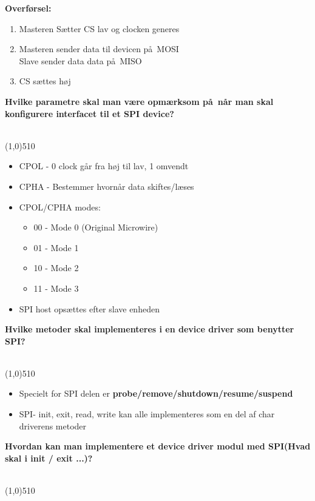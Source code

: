 \documentclass{paper}
\begin{document}
\textbf{Overf\o rsel:}
\begin{enumerate}
	\item Masteren S\ae tter CS lav og clocken generes
	\item Masteren sender data til devicen p\aa\ MOSI\\
		Slave sender data data p\aa\ MISO
	\item CS s\ae ttes h\o j\\
\end{enumerate}
\begin{large}\textbf{Hvilke parametre skal man v\ae re opm\ae rksom p\aa\ n\aa r man skal konfigurere interfacet til et SPI device?}\end{large}\\
\line(1,0){510}
\begin{itemize}
	\item CPOL - 0 clock g\aa r fra h\o j til lav, 1 omvendt
	\item CPHA - Bestemmer hvorn\aa r data skiftes/l\ae ses
	\item CPOL/CPHA modes:
	\begin{itemize}
		\item 00 - Mode 0 (Original Microwire)
		\item 01 - Mode 1
		\item 10 - Mode 2
		\item 11 - Mode 3
	\end{itemize}
	\item SPI host ops\ae ttes efter slave enheden\\	
\end{itemize}
\begin{large}\textbf{Hvilke metoder skal implementeres i en device driver som benytter SPI?}\end{large}\\
\line(1,0){510}
\begin{itemize}
	\item Specielt for SPI delen er \textbf{probe/remove/shutdown/resume/suspend}
	\item SPI- init, exit, read, write kan alle implementeres som en del af char driverens metoder\\
\end{itemize}
\begin{large}\textbf{Hvordan kan man implementere et device driver modul med SPI(Hvad skal i init / exit ...)?}\end{large}\\
\line(1,0){510}
\end{document}
